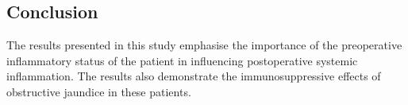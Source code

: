 \subsection{Conclusion}
The results presented in this study emphasise the importance of the preoperative inflammatory status of the patient in influencing postoperative systemic inflammation. 
The results also demonstrate the immunosuppressive effects of obstructive jaundice in these patients. 






































